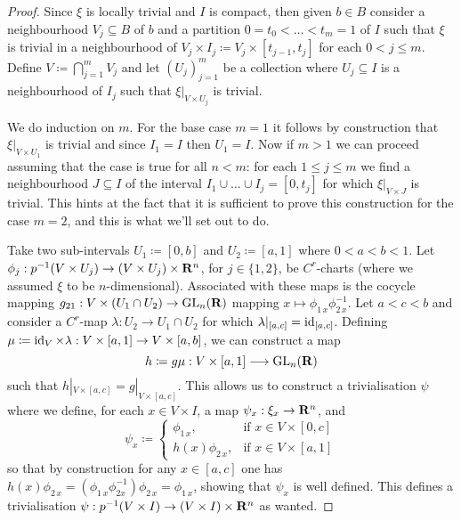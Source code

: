 \documentclass[../../../deep-dive]{subfile}
\begin{document}
\begin{proof}
Since \(\xi\) is locally trivial and \(I\) is compact, then given \(b \in B\)
consider a neighbourhood \(V_j \subseteq B\) of \(b\) and a partition
\(0 = t_0 < \dots < t_m = 1\) of \(I\) such that \(\xi\) is trivial in a
neighbourhood of \(V_j \times I_j \coloneq V_j \times [t_{j-1}, t_j]\) for each
\(0 < j \leq m\). Define \(V \coloneq \bigcap_{j=1}^m V_j\) and let
\((U_j)_{j=1}^m\) be a collection where \(U_j \subseteq I\) is a neighbourhood
of \(I_j\) such that \(\xi|_{V \times U_j}\) is trivial.

We do induction on \(m\). For the base case \(m = 1\) it follows by construction
that \(\xi|_{V \times U_1}\) is trivial and since \(I_1 = I\) then \(U_1 =
I\). Now if \(m > 1\) we can proceed assuming that the case is true for all
\(n < m\): for each \(1 \leq j \leq m\) we find a neighbourhood
\(J \subseteq I\) of the interval \(I_1 \cup \dots \cup I_j = [0, t_j]\) for
which \(\xi|_{V \times J}\) is trivial. This hints at the fact that it is
sufficient to prove this construction for the case \(m = 2\), and this is what
we'll set out to do.

Take two sub-intervals \(U_1 \coloneq [0, b]\) and \(U_2 \coloneq [a, 1]\) where
\(0 < a < b < 1\). Let
\(\phi_j: p^{-1}(V \times U_j) \to (V \times U_j) \times \mathbf{R}^n\), for
\(j \in \{1, 2\}\), be \(C^r\)-charts (where we assumed \(\xi\) to be
\(n\)-dimensional). Associated with these maps is the cocycle mapping
\(g_{2 1}: V \times (U_1 \cap U_2) \to \operatorname{GL}_n(\mathbf{R})\) mapping
\(x \mapsto \phi_{1\, x} \phi_{2\, x}^{-1}\). Let \(a < c < b\) and consider a
\(C^r\)-map \(\lambda: U_2 \to U_1 \cap U_2\) for which
\(\lambda|_{[a, c]} = \operatorname{id}_{[a, c]}\). Defining \(\mu \coloneq \operatorname{id}_V \times
\lambda: V \times [a, 1] \to V \times [a, b]\), we can construct a map
\[
h \coloneq g \mu: V \times [a, 1] \longrightarrow \operatorname{GL}_n(\mathbf{R})
\]
such that \(h|_{V \times [a, c]} = g|_{V \times [a, c]}\). This allows us to
construct a trivialisation \(\psi\) where we define, for each \(x \in V \times
I\), a map \(\psi_x: \xi_x \to \mathbf{R}^n\), and
\[
\psi_x \coloneq
\begin{cases}
  \phi_{1\, x}, &\text{if } x \in V \times [0, c] \\
  h(x) \phi_{2\, x}, &\text{if } x \in V \times [a, 1]
\end{cases}
\]
so that by construction for any \(x \in [a, c]\) one has
\(h(x) \phi_{2\, x} = (\phi_{1\, x} \phi_{2 x}^{-1}) \phi_{2\, x} = \phi_{1\,
  x}\), showing that \(\psi_x\) is well defined. This defines a trivialisation
\(\psi: p^{-1}(V \times I) \to (V \times I) \times \mathbf{R}^n\) as wanted.
\end{proof}
\end{document}
